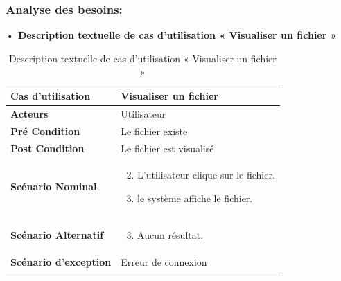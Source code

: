 \subsubsection{Analyse des besoins:}
\textbf{•	Description textuelle de cas d'utilisation « Visualiser un fichier  »}
\begin{longtable}{|p{5cm}|p{10cm}|}
\hline
\textbf{Cas d'utilisation}&Visualiser un fichier\\
\hline
\textbf{Acteurs}&Utilisateur\\
\hline
\textbf{Pré Condition}&Le fichier existe\\
\hline
\textbf{Post Condition}&Le fichier est visualisé\\
\hline
\textbf{Scénario Nominal}&
\vspace{-\baselineskip}
\begin{enumerate}
    \setcounter{enumi}{1}
  \item L'utilisateur clique sur le fichier.
  \item le système affiche le fichier.
\end{enumerate}\\
\hline
\textbf{Scénario Alternatif}&
\vspace{-\baselineskip}
\begin{enumerate}
    \setcounter{enumi}{2}
    \item Aucun résultat.
\end{enumerate}\\
\hline
\textbf{Scénario d'exception}&Erreur de connexion\\
\hline
\caption{Description textuelle de cas d'utilisation « Visualiser un fichier  »}
\label{tab:description-textuelle-de-cas-d-utilisation-visualiser-un-fichier}

\end{longtable}

